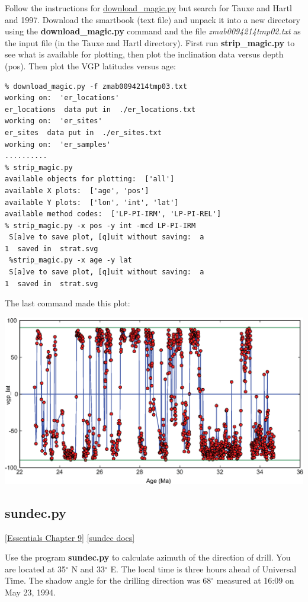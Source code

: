 \documentclass[11pt]{book}
\begin{document}
{{Follow the instructions for \href{#download_magic.py}{download\_magic.py} but search for Tauxe and Hartl and 1997.  Download the smartbook (text file) and unpack it into a new directory using the {\bf download\_magic.py} command and the file {\it zmab0094214tmp02.txt} as the input file (in the Tauxe and Hartl directory).   First run {\bf strip\_magic.py} to see what is available for plotting, then 
plot the inclination data versus depth (pos).  Then plot the VGP latitudes versus age: 
\begin{verbatim}
% download_magic.py -f zmab0094214tmp03.txt 
working on:  'er_locations'
er_locations  data put in  ./er_locations.txt
working on:  'er_sites'
er_sites  data put in  ./er_sites.txt
working on:  'er_samples'
..........
% strip_magic.py 
available objects for plotting:  ['all']
available X plots:  ['age', 'pos']
available Y plots:  ['lon', 'int', 'lat']
available method codes:  ['LP-PI-IRM', 'LP-PI-REL']
% strip_magic.py -x pos -y int -mcd LP-PI-IRM
 S[a]ve to save plot, [q]uit without saving:  a
1  saved in  strat.svg
 %strip_magic.py -x age -y lat
 S[a]ve to save plot, [q]uit without saving:  a
1  saved in  strat.svg
\end{verbatim}
The last command made this plot: 


\includegraphics[width=15cm]{EPSfiles/latVage.eps}


\subsection{sundec.py} 
\href{http://magician.ucsd.edu/Essentials_2/WebBook2ch9.html#ch9}{[Essentials Chapter 9]}
\href{http://earthref.org/PmagPy/pmagpydocs/sundec-module.html}{[sundec docs]}

Use the program {\bf sundec.py} to calculate 
azimuth of the direction of drill. You are located at 35$^{\circ}$ N and 33$^{\circ}$ E.  The local
time is three hours ahead of Universal Time.  The shadow angle for the
drilling direction was 68$^{\circ}$ measured at 16:09 on May 23, 1994.

}}
\end{document}
